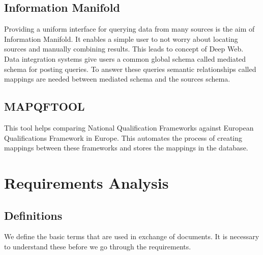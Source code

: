 \documentclass[12pt,a4paper,oneside]{book}
\begin{document}
\section{Information Manifold}
Providing a uniform interface for querying data from many sources is the aim of Information Manifold. It enables a simple user to not worry about locating sources and manually combining results. This leads to concept of Deep Web. Data integration systems give users a common global schema called mediated schema for posting queries. To answer these queries semantic relationships called mappings are needed between mediated schema and the sources schema. \\

\section{MAPQFTOOL}
This tool helps comparing National Qualification Frameworks against European Qualifications Framework in Europe. This automates the process of creating mappings between these frameworks and stores the mappings in the database. \\

\chapter{Requirements Analysis}\label{ch-requirements-analysis}
\section{Definitions}
We define the basic terms that are used in exchange of documents. It is necessary to understand these before we go through the requirements.
\end{document}
